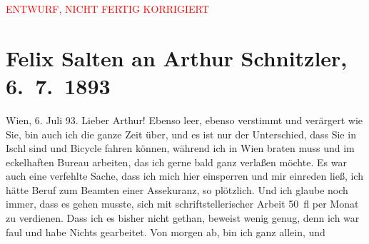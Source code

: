 
\begin{center}
            \textcolor{red}{ENTWURF, NICHT FERTIG KORRIGIERT}
                      \end{center}
            
         
         \renewcommand{\erwaehntePersonen}{Personen: Richard Beer-Hofmann, Hugo von Hofmannsthal, Paul Horn, Karl Peter Rosner, Richard Specht, Ignaz Wild}
         \renewcommand{\erwaehnteInstitutionen}{Institutionen: Saisontheater Ischl}
         \renewcommand{\erwaehnteOrte}{Orte: Bad Aussee, Bad Ischl, Rohrerhütte, Wien}
         \renewcommand{\erwaehnteWerke}{Werke: Abschiedssouper, Begräbnis, Das Märchen. Schauspiel in drei Aufzügen, Décadence. Novelletten, Psychopathia sexualis, Straßenliebe}
               \section[Felix Salten an Arthur Schnitzler, 6. 7. 1893]{ Felix Salten an Arthur Schnitzler, 6. 7. 1893}\nopagebreak{}\rehead{ }\begin{ledgroupsized}[t]{13cm}\normalsize\beginnumbering \toendnotes[C]{\smallbreak\pagebreak[2]} 
\toendnotes[C]{\smallbreak}\pstart
           {\pb}Wien, 6. Juli 93.\pend
           \pstart
           Lieber Arthur! Ebenso leer, ebenso verstimmt und verärgert wie Sie,
               bin auch ich die ganze Zeit über, und es ist nur der Unterschied, dass Sie in Ischl sind und Bicycle fahren können, während ich
               in Wien braten muss und im eckelhaften Bureau
               arbeiten, das ich gerne bald ganz verlaßen möchte. Es war auch eine verfehlte Sache,
               dass ich mich hier einsperren und mir einreden ließ, ich hätte Beruf zum Beamten
               einer Assekuranz, so plötzlich. Und ich glaube noch immer, dass es gehen musste, sich
               mit schriftstellerischer {\pb}Arbeit
               50 fl per Monat zu verdienen. Dass ich es bisher nicht gethan, beweist wenig genug,
               denn ich war faul und habe Nichts gearbeitet. Von morgen ab, bin ich ganz allein, und

\end{ledgroupsized}
